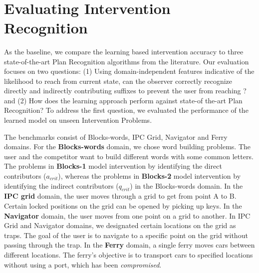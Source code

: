 ~\section{Evaluating Intervention Recognition}
\label{sec:evaluating-intervention}
As the baseline, we compare the learning based intervention accuracy to three state-of-the-art Plan Recognition algorithms from the literature. 
Our evaluation focuses on two questions: (1) Using domain-independent features indicative of the likelihood to reach \undesired from current state, can the observer correctly recognize directly and indirectly contributing suffixes to prevent the user from reaching \undesired? and (2) How does the learning approach perform against state-of the-art Plan Recognition? 
To address the first question, we evaluated the performance of the learned model on unseen Intervention Problems.

The benchmarks consist of Blocks-words, IPC Grid, Navigator and Ferry domains. For the \textbf{Blocks-words} domain, we chose word building problems. The user and the competitor want to build different words with some common letters. 
The problems in \textbf{Blocks-1} model intervention by identifying the direct contributors ($a_{crit}$), whereas the problems in \textbf{Blocks-2} model intervention by identifying the indirect contributors ($q_{crit}$) in the Blocks-words domain.
In the \textbf{IPC grid} domain, the user moves through a grid to get from point A to B. 
Certain locked positions on the grid can be opened by picking up keys. 
In the \textbf{Navigator} domain, the user moves from one point on a grid to another. 
In IPC Grid and Navigator domains, we designated certain locations on the grid as traps. 
The goal of the user is to navigate to a specific point on the grid without passing through the trap. In the \textbf{Ferry} domain, a single ferry moves cars between different locations. 
The ferry's objective is to transport cars to specified locations without using a port, which has been {\em compromised}. 


